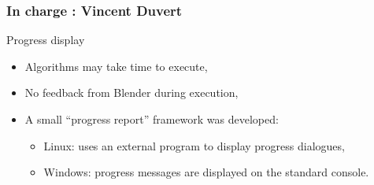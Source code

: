 \documentclass{beamer}
\begin{document}
\begin{frame}
	\frametitle{In charge : Vincent Duvert}
    \begin{block}{Progress display}
	\begin{itemize}
	\item Algorithms may take time to execute,
	\item No feedback from Blender during execution,
	\item A small ``progress report'' framework was developed:
	\begin{itemize}
		\item Linux: uses an external program to display progress dialogues,
		\item Windows: progress messages are displayed on the standard console.
	\end{itemize}
	\end{itemize}
    \end{block}
\end{frame}
\end{document}
